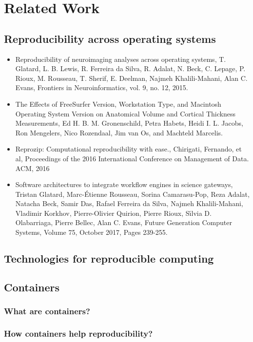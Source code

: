 \chapter{Related Work}

\section{Reproducibility across operating systems}
\begin{itemize}
 \item Reproducibility of neuroimaging analyses across operating systems, T. Glatard, L. B. Lewis, R. Ferreira da Silva, R. Adalat, N. Beck, C. Lepage, P. Rioux, M. Rousseau, T. Sherif, E. Deelman, Najmeh Khalili-Mahani, Alan C. Evans, Frontiers in Neuroinformatics, vol. 9, no. 12, 2015.
 \item The Effects of FreeSurfer Version, Workstation Type, and Macintosh Operating System Version on Anatomical Volume and Cortical Thickness Measurements, Ed H. B. M. Gronenschild, Petra Habets, Heidi I. L. Jacobs, Ron Mengelers, Nico Rozendaal, Jim van Os, and Machteld Marcelis.
 \item Reprozip: Computational reproducibility with ease., Chirigati, Fernando, et al, Proceedings of the 2016 International Conference on Management of Data. ACM, 2016
 \item Software architectures to integrate workflow engines in science gateways, Tristan Glatard, Marc-Étienne Rousseau, Sorina Camarasu-Pop, Reza Adalat, Natacha Beck, Samir Das, Rafael Ferreira da Silva, Najmeh Khalili-Mahani, Vladimir Korkhov, Pierre-Olivier Quirion, Pierre Rioux, Sı́lvia D. Olabarriaga, Pierre Bellec, Alan C. Evans, Future Generation Computer Systems, Volume 75, October 2017, Pages 239-255.
\end{itemize}

\section{Technologies for reproducible computing}
\section{Containers}
\subsection{What are containers?}
\subsection{How containers help reproducibility?}
